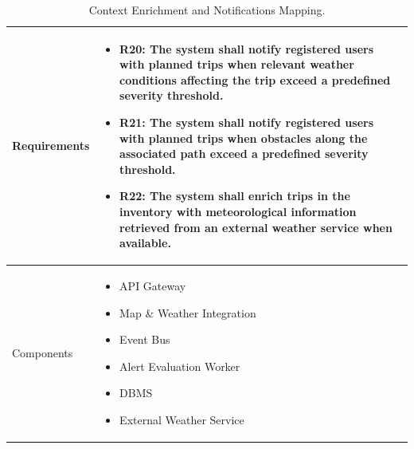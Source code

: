 \begin{table}[H]
    \centering
    \renewcommand{\arraystretch}{1.3}
    \begin{tabular}{|p{}|p{}|}
        \hline
        Requirements & \begin{itemize}[topsep=0pt, partopsep=0pt, leftmargin=*]
            \item R20: The system shall notify registered users with planned trips when relevant weather conditions affecting the trip exceed a predefined severity threshold.
            \item R21: The system shall notify registered users with planned trips when obstacles along the associated path exceed a predefined severity threshold.
            \item R22: The system shall enrich trips in the inventory with meteorological information retrieved from an external weather service when available.
        \end{itemize} \\
        \hline
        Components & \begin{itemize}[topsep=0pt, partopsep=0pt, leftmargin=*] 
            \item API Gateway
            \item Map \& Weather Integration
            \item Event Bus
            \item Alert Evaluation Worker
            \item DBMS
            \item External Weather Service
        \end{itemize} \\
        \hline
    \end{tabular}
    \caption{Context Enrichment and Notifications Mapping.}
    \label{tab:notification_mapping}
\end{table}